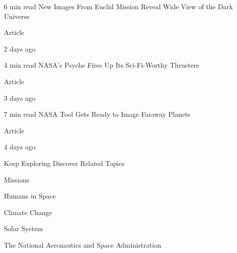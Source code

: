 \documentclass[a4paper,11pt]{article}
\begin{document}
\begin{docenv}
{6 min read
New Images From Euclid Mission Reveal Wide View of the Dark Universe

Article

	2 days ago	

 

4 min read
NASA’s Psyche Fires Up Its Sci-Fi-Worthy Thrusters

Article

	3 days ago	

 

7 min read
NASA Tool Gets Ready to Image Faraway Planets

Article

	4 days ago	

 

Keep Exploring
Discover Related Topics

Missions

 

Humans in Space

 

Climate Change

 

Solar System

 

The National Aeronautics and Space Administration}
\end{docenv}
\end{document}
